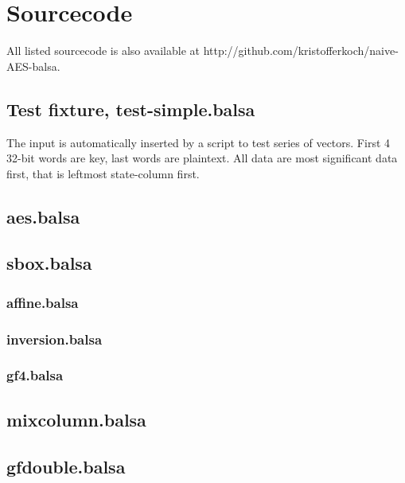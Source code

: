 \section{Sourcecode}

All listed sourcecode is also available at
http://github.com/kristofferkoch/naive-AES-balsa.

\subsection{Test fixture, test-simple.balsa}

The input is automatically inserted by a script to test series of
vectors. First 4 32-bit words are key, last words are plaintext. All
data are most significant data first, that is leftmost state-column
first.



\subsection{aes.balsa}


\subsection{sbox.balsa}


\subsubsection{affine.balsa}


\subsubsection{inversion.balsa}


\subsubsection{gf4.balsa}



\subsection{mixcolumn.balsa}


\subsection{gfdouble.balsa}

